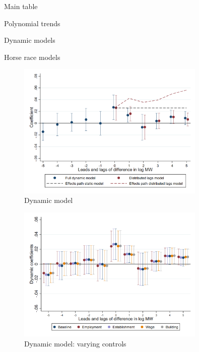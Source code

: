 \documentclass{article}
\begin{document}
\begin{table}[h!] \centering
   \caption{Main table}
   
\end{table}

\begin{table}[h!] \centering
	\caption{Polynomial trends}
	
\end{table}

\clearpage
\begin{table}[h!] \centering
	\caption{Dynamic models}
	
\end{table}


\clearpage
\begin{table}[h!] \centering
	\caption{Horse race models}
	\resizebox{\textwidth}{!}{
		
	}
\end{table}

\clearpage
\begin{figure} \centering
	\caption{Dynamic model}
	\includegraphics[width = 0.8\textwidth]{../../analysis/first_differences/output/fd_models.png}
\end{figure}


\begin{figure} \centering
	\caption{Dynamic model: varying controls}
	\includegraphics[width = 0.8\textwidth]{../../analysis/first_differences/output/fd_models_control.png}
\end{figure} 
\end{document}
